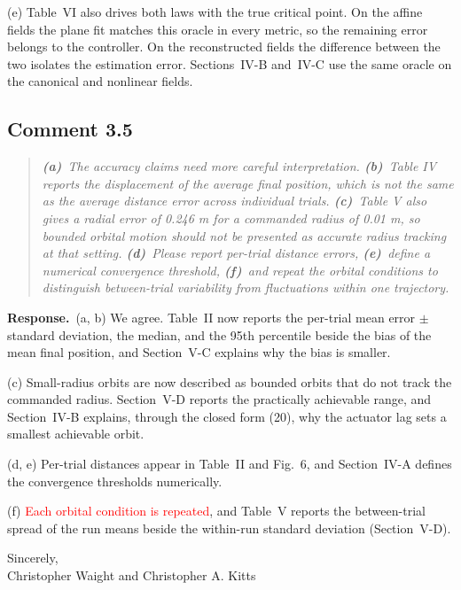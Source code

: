 \documentclass[10pt]{article}
\newcommand{\syn}[1]{\textcolor{red}{#1}}            %
\newcommand{\resp}{\par\textbf{Response.}~}
\begin{document}
(e) Table~VI also drives both laws with the true critical point. On the affine fields the plane fit matches this oracle in every metric, so the remaining error belongs to the controller. On the reconstructed fields the difference between the two isolates the estimation error. Sections~IV-B and~IV-C use the same oracle on the canonical and nonlinear fields.

\subsection*{Comment 3.5}

\begin{quote}\itshape
\textbf{(a)}~The accuracy claims need more careful interpretation.
\textbf{(b)}~Table IV reports the displacement of the average final position, which is not the same as the average distance error across individual trials.
\textbf{(c)}~Table V also gives a radial error of 0.246 m for a commanded radius of 0.01 m, so bounded orbital motion should not be presented as accurate radius tracking at that setting.
\textbf{(d)}~Please report per-trial distance errors,
\textbf{(e)}~define a numerical convergence threshold,
\textbf{(f)}~and repeat the orbital conditions to distinguish between-trial variability from fluctuations within one trajectory.
\end{quote}


\resp (a, b) We agree. Table~II now reports the per-trial mean error $\pm$ standard deviation, the median, and the 95th percentile beside the bias of the mean final position, and Section~V-C explains why the bias is smaller.

(c) Small-radius orbits are now described as bounded orbits that do not track the commanded radius. Section~V-D reports the practically achievable range, and Section~IV-B explains, through the closed form (20), why the actuator lag sets a smallest achievable orbit.

(d, e) Per-trial distances appear in Table~II and Fig.~6, and Section~IV-A defines the convergence thresholds numerically.

(f) \syn{Each orbital condition is repeated}, and Table~V reports the between-trial spread of the run means beside the within-run standard deviation (Section~V-D).


Sincerely,\\
Christopher Waight and Christopher A. Kitts
\end{document}
